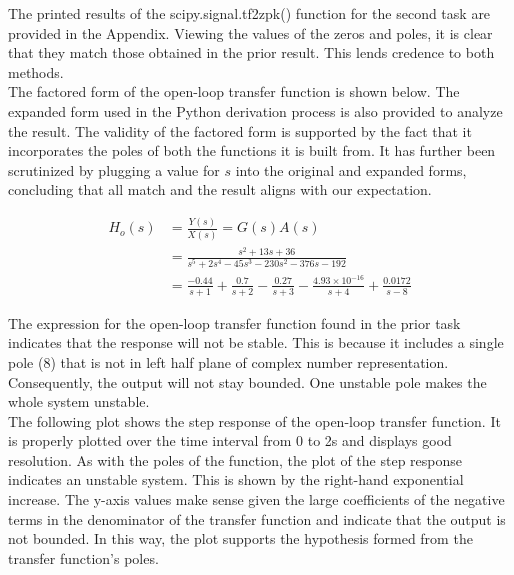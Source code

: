 \documentclass[12pt]{report}
\begin{document}
The printed results of the scipy.signal.tf2zpk() function for the second task are provided in the Appendix. Viewing the values of the zeros and poles, it is clear that they match those obtained in the prior result. This lends credence to both methods. \\

The factored form of the open-loop transfer function is shown below. The expanded form used in the Python derivation process is also provided to analyze the result. The validity of the factored form is supported by the fact that it incorporates the poles of both the functions it is built from. It has further been scrutinized by plugging a value for $ s $ into the original and expanded forms, concluding that all match and the result aligns with our expectation.

\begin{align*}
	H_o(s) &= \frac{Y(s)}{X(s)} = G(s)A(s) \\
	&= \frac{s^2 + 13s + 36}{s^5 + 2s^4 - 45s^3 - 230s^2 - 376s - 192} \\
	&= \frac{-0.44}{s + 1} + \frac{0.7}{s + 2} - \frac{0.27}{s + 3} - \frac{4.93 \times 10^{-16}}{s + 4} + \frac{0.0172}{s - 8}
\end{align*}
 
The expression for the open-loop transfer function found in the prior task indicates that the response will not be stable. This is because it includes a single pole ($ 8 $) that is not in left half plane of complex number representation. Consequently, the output will not stay bounded. One unstable pole makes the whole system unstable. \\

The following plot shows the step response of the open-loop transfer function. It is properly plotted over the time interval from 0 to 2s and displays good resolution. As with the poles of the function, the plot of the step response indicates an unstable system. This is shown by the right-hand exponential increase. The y-axis values make sense given the large coefficients of the negative terms in the denominator of the transfer function and indicate that the output is not bounded. In this way, the plot supports the hypothesis formed from the transfer function's poles. \\
\end{document}
